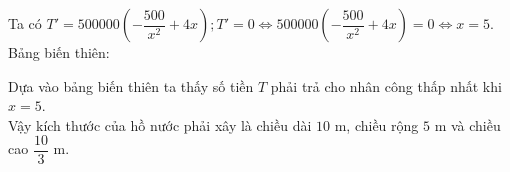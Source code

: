 \begin{ex}
{   Ta có $T' = 500000 \left( -\dfrac{500}{x^2} + 4x \right);T' = 0 \Leftrightarrow 500000 \left( -\dfrac{500}{x^2} + 4x \right) = 0 \Leftrightarrow x = 5$.\\
   Bảng biến thiên:
   \begin{center}
   \end{center}
   Dựa vào bảng biến thiên ta thấy số tiền $T$ phải trả cho nhân công thấp nhất khi $x = 5$.\\
   Vậy kích thước của hồ nước phải xây là chiều dài $10$ m, chiều rộng $5$ m và chiều cao $\dfrac{10}{3}$ m.
  }
\end{ex}

